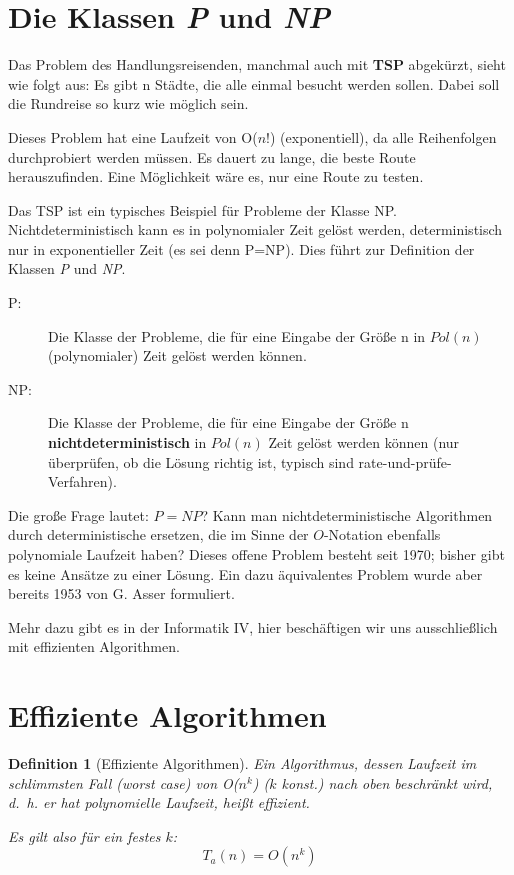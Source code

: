 \documentclass{scrreprt}%
\theoremstyle{break}
\newtheorem{definition}{Definition}
\begin{document}
\section{Die Klassen \textit{P} und \textit{NP}}
Das Problem des Handlungsreisenden, manchmal auch mit \textbf{TSP} abgekürzt, sieht wie folgt aus:
Es gibt n Städte, die alle einmal besucht werden sollen. Dabei soll die
Rundreise so kurz wie möglich sein.

Dieses Problem hat eine Laufzeit von O($n!$) (exponentiell), da alle
Reihenfolgen durchprobiert werden müssen.  Es dauert zu lange, die beste
Route herauszufinden. Eine Möglichkeit wäre es, nur eine Route zu
testen.

Das TSP ist ein typisches Beispiel für Probleme der Klasse NP. 
Nichtdeterministisch kann es in polynomialer Zeit  gelöst werden, 
deterministisch nur in exponentieller Zeit (es sei denn P=NP). Dies führt zur Definition der Klassen \textit {P} und \textit {NP}.

\begin{description}
 \item[P:] Die Klasse der Probleme, die für eine Eingabe der Größe n in
  $Pol(n)$ (polynomialer) Zeit gelöst werden können.
 \item[NP:] Die Klasse der Probleme, die für eine Eingabe der Größe n
  \textbf{nichtdeterministisch} in $Pol(n)$ Zeit gelöst werden können 
  (nur überprüfen, ob die Lösung richtig ist, typisch sind
  rate-und-prüfe-Verfahren).
\end{description}

Die große Frage lautet: $P=NP$? Kann man nichtdeterministische Algorithmen durch deterministische ersetzen,
die im Sinne der $O$-Notation ebenfalls polynomiale Laufzeit haben?
Dieses offene Problem besteht seit 1970; bisher gibt es keine Ansätze zu einer Lösung. Ein
dazu äquivalentes Problem wurde aber bereits 1953 von G. Asser formuliert.

Mehr dazu gibt es in der Informatik IV, hier beschäftigen wir uns ausschließlich mit effizienten Algorithmen.

\section{Effiziente Algorithmen}

\begin{definition}[Effiziente Algorithmen]
  Ein Algorithmus, dessen Laufzeit im schlimmsten Fall (\emph{worst
  case}) von O($n^k$) ($k$ konst.) nach oben beschränkt wird, d.~h. er hat
  \emph{polynomielle Laufzeit}, heißt effizient.
  
  Es gilt also für ein festes $k$:
  \begin{equation*}
    T_a (n)= O(n^k)     
  \end{equation*}
\end{definition}
\end{document}
